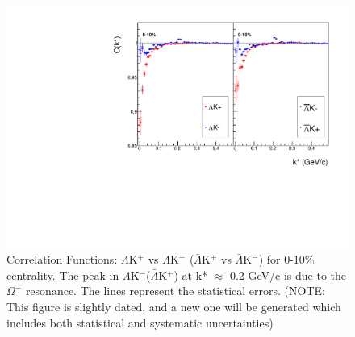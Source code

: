 \documentclass[../AnalysisNoteJBuxton.tex]{subfiles}
\begin{document}
\begin{figure}[h]
  \centering
  \includegraphics[width=\textwidth]{4_CorrelationFunctions/Figures/canLamKchPvsLamKchM0010.pdf}
  \caption[Correlation Functions: $\Lambda$K$^{+}$ vs $\Lambda$K$^{-}$ for 0-10\% Centrality]{Correlation Functions: $\Lambda$K$^{+}$ vs $\Lambda$K$^{-}$ ($\bar{\Lambda}$K$^{+}$ vs $\bar{\Lambda}$K$^{-}$) for 0-10\% centrality.  The peak in $\Lambda$K$^{-}$($\bar{\Lambda}$K$^{+}$) at k* $\approx$ 0.2 GeV/c is due to the $\Omega^{-}$ resonance.  The lines represent the statistical errors. (NOTE: This figure is slightly dated, and a new one will be generated which includes both statistical and systematic uncertainties)}
  \label{fig:cLamcKchCfs0010}
\end{figure}

\clearpage
\end{document}
